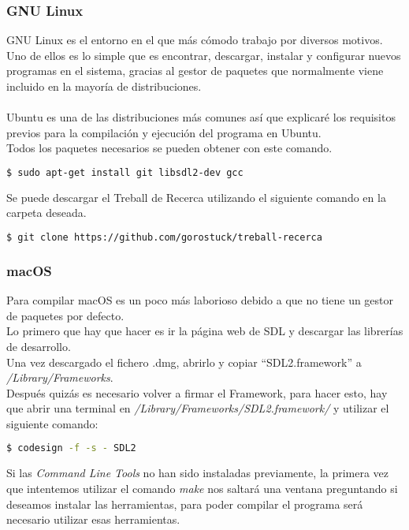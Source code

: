 \subsubsection{GNU Linux}
GNU Linux es el entorno en el que más cómodo trabajo por diversos motivos. Uno de ellos es lo simple que es encontrar, descargar, instalar y configurar nuevos programas en el sistema, gracias al gestor de paquetes que normalmente viene incluido en la mayoría de distribuciones.
\\\\
Ubuntu es una de las distribuciones más comunes así que explicaré los requisitos previos para la compilación y ejecución del programa en Ubuntu.
\\ Todos los paquetes necesarios se pueden obtener con este comando.
\begin{lstlisting}[language=bash]
  $ sudo apt-get install git libsdl2-dev gcc
\end{lstlisting}
Se puede descargar el Treball de Recerca utilizando el siguiente comando en la carpeta deseada.
\begin{lstlisting}[language=bash]
  $ git clone https://github.com/gorostuck/treball-recerca
\end{lstlisting}

\subsubsection{macOS}
Para compilar macOS es un poco más laborioso debido a que no tiene un gestor de paquetes por defecto.
\\ Lo primero que hay que hacer es ir la página web de SDL y descargar las librerías de desarrollo.
\\ Una vez descargado el fichero .dmg, abrirlo y copiar ``SDL2.framework'' a \textit{/Library/Frameworks}.
\\ Después quizás es necesario volver a firmar el Framework, para hacer esto, hay que abrir una terminal en \textit{/Library/Frameworks/SDL2.framework/} y utilizar el siguiente comando:
\begin{lstlisting}[language=bash]
  $ codesign -f -s - SDL2
\end{lstlisting}
Si las \textit{Command Line Tools} no han sido instaladas previamente, la primera vez que intentemos utilizar el comando \textit{make} nos saltará una ventana preguntando si deseamos instalar las herramientas, para poder compilar el programa será necesario utilizar esas herramientas.



